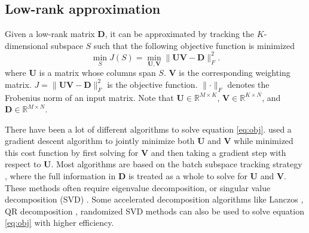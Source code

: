 \subsection{Low-rank approximation}
Given a low-rank matrix $\mathbf{D}$, it can be approximated by tracking the $K$-dimensional subspace $S$ such that 
the following objective function is minimized 
\begin{equation}
\label{eq:obj}
\min_{S} J(S) = \min_{\mathbf{U},\mathbf{V}} \parallel \mathbf{U}\mathbf{V} - \mathbf{D} \parallel_F^2.
\end{equation}
where $\mathbf{U}$ is a matrix whose columns span $S$.  $\mathbf{V}$ is the corresponding weighting matrix. $J=\parallel \mathbf{U}\mathbf{V} - \mathbf{D} \parallel_F^2$ is the objective function. $\parallel \cdot \parallel_F$ denotes the Frobenius norm of an input matrix. Note that $\mathbf{U}\in \mathbb{R}^{M\times K}$, $\mathbf{V}\in \mathbb{R}^{K\times N}$, and $\mathbf{D}\in \mathbb{R}^{M\times N}$.  


There have been a lot of different algorithms to solve equation \ref{eq:obj}. \cite{keshavan2010} used a gradient descent algorithm to jointly  minimize both $\mathbf{U}$ and $\mathbf{V}$ while \cite{dai2010} minimized this cost function by first solving for $\mathbf{V}$ 
and then taking a gradient step with respect to $\mathbf{U}$. Most algorithms are based on the batch subspace tracking strategy \cite[]{laura2010}, where the full information in $\mathbf{D}$ is treated as a whole to solve for $\mathbf{U}$ and $\mathbf{V}$. These methods often require eigenvalue decomposition, or singular value decomposition (SVD) . Some accelerated decomposition algorithms like Lanczos \cite[]{jianjun2013}, QR decomposition \cite[]{jinkun2016}, randomized SVD methods \cite[]{mssa} can also be used to solve equation \ref{eq:obj} with higher efficiency. 

